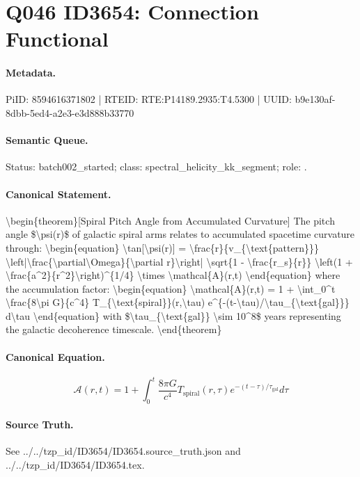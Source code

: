 \section*{Q046 ID3654: Connection Functional}
\paragraph{Metadata.}
PiID: 8594616371802 | RTEID: RTE:P14189.2935:T4.5300 | UUID: b9e130af-8dbb-5ed4-a2e3-e3d888b33770

\paragraph{Semantic Queue.}
Status: batch002\_started; class: spectral\_helicity\_kk\_segment; role: .

\paragraph{Canonical Statement.}
\textbackslash{}begin\{theorem\}[Spiral Pitch Angle from Accumulated Curvature] The pitch angle \$\textbackslash{}psi(r)\$ of galactic spiral arms relates to accumulated spacetime curvature through: \textbackslash{}begin\{equation\} \textbackslash{}tan[\textbackslash{}psi(r)] = \textbackslash{}frac\{r\}\{v\_\{\textbackslash{}text\{pattern\}\}\} \textbackslash{}left|\textbackslash{}frac\{\textbackslash{}partial\textbackslash{}Omega\}\{\textbackslash{}partial r\}\textbackslash{}right| \textbackslash{}sqrt\{1 - \textbackslash{}frac\{r\_s\}\{r\}\} \textbackslash{}left(1 + \textbackslash{}frac\{a\textasciicircum{}2\}\{r\textasciicircum{}2\}\textbackslash{}right)\textasciicircum{}\{1/4\} \textbackslash{}times \textbackslash{}mathcal\{A\}(r,t) \textbackslash{}end\{equation\} where the accumulation factor: \textbackslash{}begin\{equation\} \textbackslash{}mathcal\{A\}(r,t) = 1 + \textbackslash{}int\_0\textasciicircum{}t \textbackslash{}frac\{8\textbackslash{}pi G\}\{c\textasciicircum{}4\} T\_\{\textbackslash{}text\{spiral\}\}(r,\textbackslash{}tau) e\textasciicircum{}\{-(t-\textbackslash{}tau)/\textbackslash{}tau\_\{\textbackslash{}text\{gal\}\}\} d\textbackslash{}tau \textbackslash{}end\{equation\} with \$\textbackslash{}tau\_\{\textbackslash{}text\{gal\}\} \textbackslash{}sim 10\textasciicircum{}8\$ years representing the galactic decoherence timescale. \textbackslash{}end\{theorem\}

\paragraph{Canonical Equation.}
\[
\begin{equation} \mathcal{A}(r,t) = 1 + \int_0^t \frac{8\pi G}{c^4} T_{\text{spiral}}(r,\tau) e^{-(t-\tau)/\tau_{\text{gal}}} d\tau \end{equation}
\]

\paragraph{Source Truth.}
See ../../tzp\_id/ID3654/ID3654.source\_truth.json and ../../tzp\_id/ID3654/ID3654.tex.
